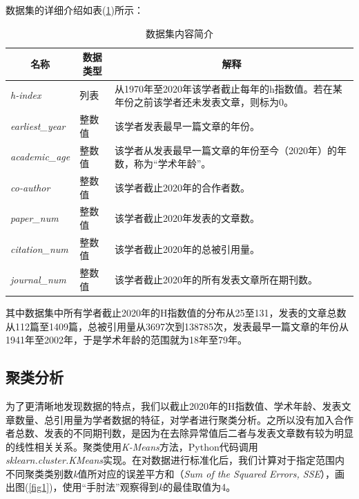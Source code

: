 \documentclass[lang=cn,11pt,a4paper,cite=authoryear]{elegantpaper}
\begin{document}
数据集的详细介绍如表(\ref{tab1})所示：

\begin{table}[H]
	\centering
	\caption{数据集内容简介}
	\label{tab1}
	\begin{tabular}{@{}llp{8cm}@{}}
		\toprule
		\multicolumn{1}{c}{名称} & \multicolumn{1}{c}{数据类型} & \multicolumn{1}{c}{解释}                          \\ \midrule
		\textit{h-index}                & 列表                       & 从1970年至2020年该学者截止每年的h指数值。若在某年份之前该学者还未发表文章，则标为0。 \\
		\textit{earliest\_year}         & 整数值                      & 该学者发表最早一篇文章的年份。                                 \\
		\textit{academic\_age}          & 整数值                      & 该学者从发表最早一篇文章的年份至今（2020年）的年数，称为“学术年龄”。           \\
		\textit{co-author}              & 整数值                      & 该学者截止2020年的合作者数。                                \\
		\textit{paper\_num}             & 整数值                      & 该学者截止2020年发表的文章数。                               \\
		\textit{citation\_num}          & 整数值                      & 该学者截止2020年的总被引用量。                               \\
		\textit{journal\_num}           & 整数值                      & 该学者截止2020年的所有发表文章所在期刊数。                         \\ \bottomrule
	\end{tabular}
\end{table}

其中数据集中所有学者截止2020年的H指数值的分布从25至131，发表的文章总数从112篇至1409篇，总被引用量从3697次到138785次，发表最早一篇文章的年份从1941年至2002年，于是学术年龄的范围就为18年至79年。

\subsection{聚类分析}

为了更清晰地发现数据的特点，我们以截止2020年的H指数值、学术年龄、发表文章数量、总引用量为学者数据的特征，对学者进行聚类分析。之所以没有加入合作者总数、发表的不同期刊数，是因为在去除异常值后二者与发表文章数有较为明显的线性相关关系。聚类使用\textit{K-Means}方法，Python代码调用\textit{sklearn.cluster.KMeans}实现。在对数据进行标准化后，我们计算对于指定范围内不同聚类类别数\textit{k}值所对应的误差平方和（\textit{Sum of the Squared Errors, SSE}），画出图(\ref{fig1})，使用“手肘法”观察得到\textit{k}的最佳取值为4。
\end{document}
